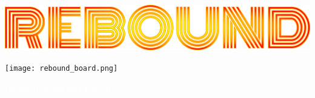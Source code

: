 \documentclass[parskip=half]{scrartcl}
\begin{document}
\begin{center}
\includegraphics[width=\textwidth]{rebound_logo.png}

\vfill

\texttt{[image: rebound\_board.png]}
\end{center}
\bigskip
\LARGE
\phantom{a}\hfill\textcolor{white}{Designed by Michael Purcell}\hfill\phantom{a}
\end{document}
